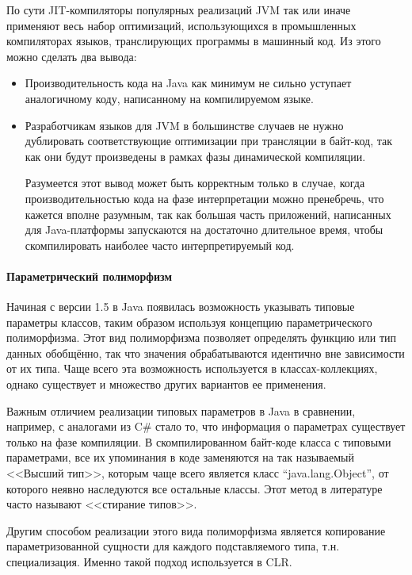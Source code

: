 По сути JIT-компиляторы популярных реализаций JVM так или иначе применяют весь набор оптимизаций,
использующихся в промышленных компиляторах языков, транслирующих программы в машинный код.
Из этого можно сделать два вывода:
\begin{itemize}
    \item Производительность кода на Java как минимум не сильно уступает аналогичному коду,
    написанному на компилируемом языке.
    \item Разработчикам языков для JVM в большинстве случаев не нужно дублировать соответствующие
    оптимизации при трансляции в байт-код, так как они будут произведены в рамках фазы
    динамической компиляции.

    Разумеется этот вывод может быть корректным только в случае, когда производительностью кода
    на фазе интерпретации можно пренебречь, что кажется вполне разумным, так как большая часть
    приложений, написанных для Java-платформы запускаются на достаточно длительное время,
    чтобы скомпилировать наиболее часто интерпретируемый код.
\end{itemize}

\paragraph{Параметрический полиморфизм}
Начиная с версии 1.5 в Java появилась возможность указывать типовые параметры классов, таким
образом используя концепцию параметрического полиморфизма.
Этот вид полиморфизма позволяет определять функцию или тип данных обобщённо, так что значения
обрабатываются идентично вне зависимости от их типа.
Чаще всего эта возможность используется в классах-коллекциях, однако существует и множество
других вариантов ее применения.

Важным отличием реализации типовых параметров в Java в сравнении, например, с аналогами из C\#
стало то, что информация о параметрах существует только на фазе компиляции.
В скомпилированном байт-коде класса с типовыми параметрами, все их упоминания в коде заменяются на
так называемый <<Высший тип>>, которым чаще всего является класс ``java.lang.Object'', от которого
неявно наследуются все остальные классы. Этот метод в литературе часто называют <<стирание типов>>.

Другим способом реализации этого вида полиморфизма является копирование параметризованной сущности
для каждого подставляемого типа, т.н. специализация. Именно такой подход используется в
CLR\cite{CLRGenerics}.

